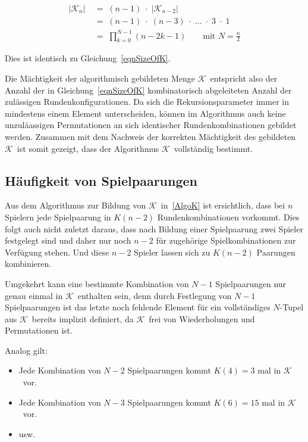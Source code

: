 \documentclass[DIV=15, 10pt]{scrartcl}
\newcommand{\KSet}{$\mathcal{K}$}
\begin{document}
\begin{align}\label{eqnSizeOfK_Alt}
\lvert \mathcal{K}_n \rvert \; &= \; (n-1) \; \cdot \; \lvert \mathcal{K}_{n-2} \rvert \nonumber \\[3mm]
&= \; (n-1) \; \cdot \; (n - 3) \; \cdot \; \ldots \; \cdot \; 3 \; \cdot \; 1 \nonumber \\[3mm]
&= \; \prod_{k = 0}^{N -1}(n - 2k - 1) \qquad \text{mit }N = \frac{n}{2}
\end{align}

Dies ist identisch zu Gleichung~\eqref{eqnSizeOfK}.

Die Mächtigkeit der algorithmisch gebildeten Menge \KSet\ entspricht also der Anzahl der in Gleichung~\eqref{eqnSizeOfK} kombinatorisch abgeleiteten Anzahl der zulässigen Rundenkonfigurationen. Da sich die Rekursionsparameter immer in mindestens einem Element unterscheiden, können im Algorithmus auch keine unzuläassigen Permutationen an sich identischer Rundenkombinationen gebildet werden. Zusammen mit dem Nachweis der korrekten Mächtigkeit des gebildeten \KSet\ ist somit gezeigt, dass der Algorithmus \KSet\ vollständig bestimmt.

\subsection{Häufigkeit von Spielpaarungen}
\label{laHaeufigkeit}

Aus dem Algorithmus zur Bildung von \KSet\ in~\eqref{AlgoK} ist ersichtlich, dass bei $n$ Spielern jede Spielpaarung in $K(n-2)$ Rundenkombinationen vorkommt. Dies folgt auch nicht zuletzt daraus, dass nach Bildung einer Spielpaarung zwei Spieler festgelegt sind und daher nur noch $n-2$ für zugehörige Spielkombinationen zur Verfügung stehen. Und diese $n-2$ Spieler lassen sich zu $K(n-2)$ Paarungen kombinieren.

Umgekehrt kann eine bestimmte Kombination von $N-1$ Spielpaarungen nur genau einmal in \KSet\ enthalten sein, denn durch Festlegung von $N-1$ Spielpaarungen ist das letzte noch fehlende Element für ein vollständiges $N$-Tupel aus \KSet\ bereits implizit definiert, da \KSet\ frei von Wiederholungen und Permutationen ist.

Analog gilt:

\begin{itemize}

\item Jede Kombination von $N-2$ Spielpaarungen kommt $K(4) = 3$ mal in \KSet\ vor.

\item Jede Kombination von $N-3$ Spielpaarungen kommt $K(6) = 15$ mal in \KSet\ vor.

\item usw.
\end{itemize}
\end{document}
